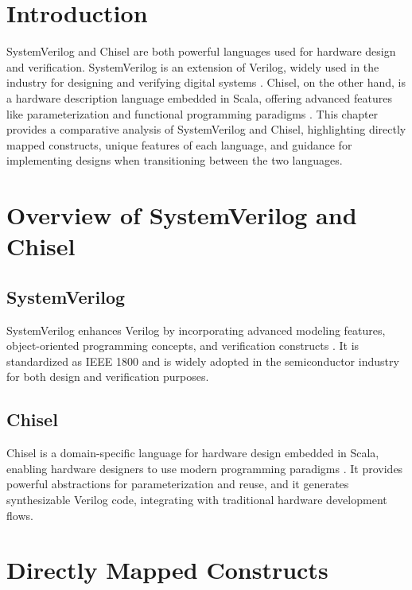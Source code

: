 \section{Introduction}


SystemVerilog and Chisel are both powerful languages used for hardware design and verification. SystemVerilog is an extension of Verilog, widely used in the industry for designing and verifying digital systems \cite{ieee1800-2017}. Chisel, on the other hand, is a hardware description language embedded in Scala, offering advanced features like parameterization and functional programming paradigms \cite{bachrach2012chisel}. This chapter provides a comparative analysis of SystemVerilog and Chisel, highlighting directly mapped constructs, unique features of each language, and guidance for implementing designs when transitioning between the two languages.

\section{Overview of SystemVerilog and Chisel}

\subsection{SystemVerilog}

SystemVerilog enhances Verilog by incorporating advanced modeling features, object-oriented programming concepts, and verification constructs \cite{baker2010systemverilog}. It is standardized as IEEE 1800 and is widely adopted in the semiconductor industry for both design and verification purposes.

\subsection{Chisel}

Chisel is a domain-specific language for hardware design embedded in Scala, enabling hardware designers to use modern programming paradigms \cite{chisel-doc}. It provides powerful abstractions for parameterization and reuse, and it generates synthesizable Verilog code, integrating with traditional hardware development flows.

\section{Directly Mapped Constructs}

